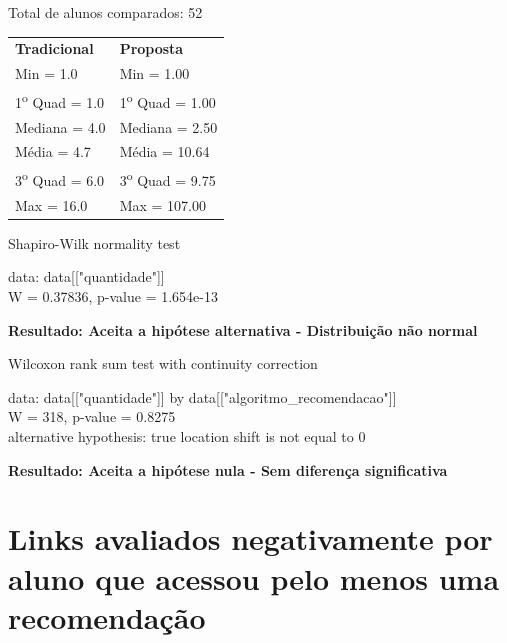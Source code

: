 \noindent
Total de alunos comparados: 52

\begin{table}[h]
\begin{tabular}{p{}p{}}
\textbf{Tradicional} & \textbf{Proposta}\\
Min =  1.0 & Min =   1.00\\
1\textsuperscript{o} Quad = 1.0 & 1\textsuperscript{o} Quad = 1.00\\
Mediana =  4.0 & Mediana =   2.50\\
Média =  4.7 & Média =  10.64\\
3\textsuperscript{o} Quad = 6.0 & 3\textsuperscript{o} Quad = 9.75\\
Max = 16.0 & Max = 107.00\\
\end{tabular}
\end{table}

  Shapiro-Wilk normality test

\noindent
data:  data[["quantidade"]]\\
W = 0.37836, p-value = 1.654e-13

\noindent
\textbf{Resultado: Aceita a hipótese alternativa - Distribuição não normal}

Wilcoxon rank sum test with continuity correction

\noindent
data:  data[["quantidade"]] by data[["algoritmo\_recomendacao"]]\\
W = 318, p-value = 0.8275\\
alternative hypothesis: true location shift is not equal to 0

\noindent
\textbf{Resultado: Aceita a hipótese nula - Sem diferença significativa}

\newpage
\section{Links avaliados negativamente por aluno que acessou pelo menos uma recomendação}


